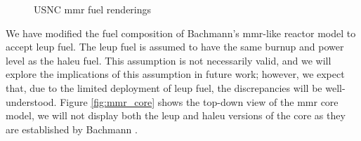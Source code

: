 \begin{figure}[H]
    \hfill
    \caption{
    USNC \gls{mmr} fuel renderings
      \cite{usnc_media_kit}}
    \label{fig:usnc_fuel}
\end{figure}

We have modified the fuel composition of Bachmann's \gls{mmr}-like reactor model to accept \gls{leup} fuel. The \gls{leup} fuel is assumed to have the same burnup and power level as the \gls{haleu} fuel. This assumption is not necessarily valid, and we will explore the implications of this assumption in future work; however, we expect that, due to the limited deployment of \gls{leup} fuel, the discrepancies will be well-understood. Figure \ref{fig:mmr_core} shows the top-down view of the \gls{mmr} core model, we will not display both the \gls{leup} and \gls{haleu} versions of the core as they are established by Bachmann \cite{bachmann_thesis_2023}.


